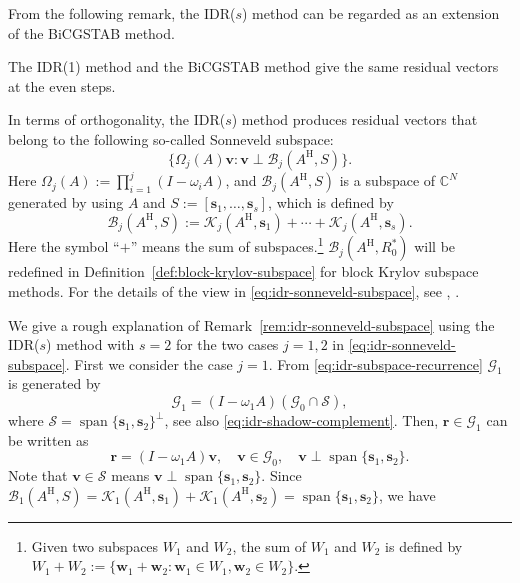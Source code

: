 {From the following remark, the IDR($s$) method can be regarded as an extension of the BiCGSTAB method.}
\par{}
\begin{Remark}\label{rem:idr-bicgstab-equivalence}
{The IDR(1) method and the BiCGSTAB method give the same residual vectors at the even steps.}
\end{Remark}
\par{}
\begin{Remark}\label{rem:idr-sonneveld-subspace}
{In terms of orthogonality, the IDR($s$) method produces residual vectors that belong to the following so-called Sonneveld subspace:}
\begin{equation}\label{eq:idr-sonneveld-subspace}\{\Omega_j(A)\bm v:\bm v\perp\mathcal B_j(A^{\mathrm H},S)\}.\end{equation}
{Here $\Omega_j(A):=\prod_{i=1}^j(I-\omega_iA)$, and $\mathcal B_j(A^{\mathrm H},S)$ is a subspace of $\mathbb C^N$ generated by using $A$ and $S:=[\bm s_1,\ldots,\bm s_s]$, which is defined by}
\[\mathcal B_j(A^{\mathrm H},S):=\mathcal K_j(A^{\mathrm H},\bm s_1)+\cdots+\mathcal K_j(A^{\mathrm H},\bm s_s).\]
{Here the symbol ``$+$'' means the sum of subspaces.}\footnote{{Given two subspaces $W_1$ and $W_2$, the sum of $W_1$ and $W_2$ is defined by $W_1+W_2:=\{\bm w_1+\bm w_2:\bm w_1\in W_1,\bm w_2\in W_2\}$.}}
{$\mathcal B_j(A^{\mathrm H},R_0^{*})$ will be redefined in Definition\ \ref{def:block-krylov-subspace} for block Krylov subspace methods. For the details of the view in \eqref{eq:idr-sonneveld-subspace}, see , .}
\end{Remark}
{We give a rough explanation of Remark\ \ref{rem:idr-sonneveld-subspace} using the IDR($s$) method with $s=2$ for the two cases $j=1,2$ in \eqref{eq:idr-sonneveld-subspace}. First we consider the case $j=1$. From \eqref{eq:idr-subspace-recurrence} $\mathcal G_1$ is generated by}
\[\mathcal G_1=(I-\omega_1A)(\mathcal G_0\cap\mathcal S),\]
{where $\mathcal S=\operatorname{span}\{\bm s_1,\bm s_2\}^{\perp}$, see also \eqref{eq:idr-shadow-complement}. Then, $\bm r\in\mathcal G_1$ can be written as}
\[\bm r=(I-\omega_1A)\bm v,\quad\bm v\in\mathcal G_0,\quad\bm v\perp\operatorname{span}\{\bm s_1,\bm s_2\}.\]
{Note that $\bm v\in\mathcal S$ means $\bm v\perp\operatorname{span}\{\bm s_1,\bm s_2\}$. Since $\mathcal B_1(A^{\mathrm H},S)=\mathcal K_1(A^{\mathrm H},\bm s_1)+\mathcal K_1(A^{\mathrm H},\bm s_2)=\operatorname{span}\{\bm s_1,\bm s_2\}$, we have}
